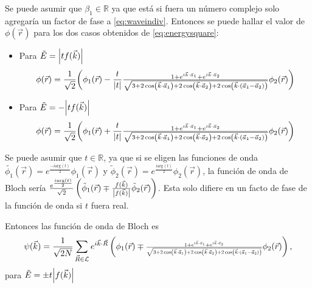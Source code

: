 Se puede asumir que $\beta_1\in \mathbb{R}$ ya que está si fuera un número complejo solo agregaría un factor de fase a \eqref{eq:waveindiv}. Entonces se puede hallar el valor de $\phi(\vec{r})$ para los dos casos obtenidos de \eqref{eq:energysquare}:
\begin{itemize}
  \item Para $\tilde{E} = \abs{tf(\vec{k})}$
	      \begin{equation}
		      \phi(\vec{r}) = \frac{1}{\sqrt{2}}\bigg(\phi_1(\vec{r})-\frac{t}{\abs{t}}\resizebox{0.5\textwidth}{!}{$\frac{1 + e^{i \vec{k}\cdot \vec{a}_1}+e^{i \vec{k}\cdot \vec{a}_2}}{\sqrt{3+2 \cos\left(\vec{k} \cdot \vec{a}_1\right)+2 \cos\left(\vec{k}\cdot \vec{a}_2\right)+2 \cos\left(\vec{k}\cdot (\vec{a}_1-\vec{a}_2)\right)}}$}\phi_2(\vec{r})\bigg)
	      \end{equation}
      \item Para $\tilde{E} = -\abs{tf(\vec{k})}$
	      \begin{equation}
		      \phi(\vec{r}) = \frac{1}{\sqrt{2}}\bigg(\phi_1(\vec{r})+\frac{t}{\abs{t}}\resizebox{0.5\textwidth}{!}{$\frac{1 + e^{i \vec{k}\cdot \vec{a}_1}+e^{i \vec{k}\cdot \vec{a}_2}}{\sqrt{3+2 \cos\left(\vec{k} \cdot \vec{a}_1\right)+2 \cos\left(\vec{k}\cdot \vec{a}_2\right)+2 \cos\left(\vec{k}\cdot (\vec{a}_1-\vec{a}_2)\right)}}$}\phi_2(\vec{r})\bigg)
	      \end{equation}
\end{itemize}
Se puede asumir que $t \in \mathbb{R}$, ya que si se eligen las funciones de onda $\tilde{\phi_1}(\vec{r}) = e^{\frac{-i\text{arg}(t)}{2}}\phi_1(\vec{r})$ y $\tilde{\phi}_2(\vec{r}) = e^{\frac{i\text{arg}(t)}{2}}\phi_2(\vec{r})$, la función de onda de Bloch sería $\frac{e^{\frac{i\text{arg}(t)}{2}}}{\sqrt{2}}\left(\tilde{\phi}_1(\vec{r}) \mp \frac{f(\vec{k})}{\abs{f(\vec{k})}}\tilde{\phi}_2(\vec{r})\right)$. Esta solo difiere en un facto de fase de la función de onda si $t$ fuera real.\par
Entonces las función de onda de Bloch es
\begin{equation}
   \psi(\vec{k}) = \frac{1}{\sqrt{2N}}\sum_{\vec{R} \in \mathcal{L}}e^{i \vec{k}\cdot \vec{R}} \left(\phi_1(\vec{r}) \mp \resizebox{0.4\textwidth}{!}{$\frac{1 + e^{i \vec{k}\cdot \vec{a}_1}+e^{i \vec{k}\cdot \vec{a}_2}}{\sqrt{3+2 \cos\left(\vec{k} \cdot \vec{a}_1\right)+2 \cos\left(\vec{k}\cdot \vec{a}_2\right)+2 \cos\left(\vec{k}\cdot (\vec{a}_1-\vec{a}_2)\right)}}$}\phi_2(\vec{r})\right),
\end{equation}
para $\tilde{E} = \pm t \abs{f(\vec{k})}$
